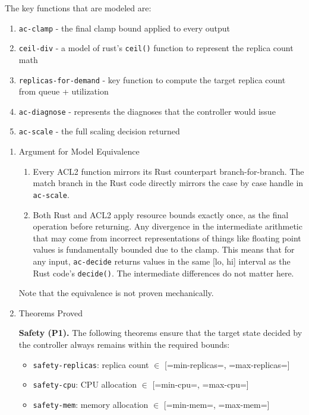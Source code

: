 \documentclass[twocolumn]{article}
\begin{document}
The key functions that are modeled are:
\begin{enumerate}
\item \texttt{ac-clamp} - the final clamp bound applied to every output
\item \texttt{ceil-div} - a model of rust's \texttt{ceil()} function to represent the replica count math
\item \texttt{replicas-for-demand} - key function to compute the target replica count from queue + utilization
\item \texttt{ac-diagnose} - represents the diagnoses that the controller would issue
\item \texttt{ac-scale} - the full scaling decision returned
\end{enumerate}
\begin{enumerate}
\item Argument for Model Equivalence
\label{sec:org02d3ddc}

\begin{enumerate}
\item Every ACL2 function mirrors its Rust counterpart branch-for-branch. The match branch in the Rust code directly mirrors the case by case handle in \texttt{ac-scale}.
\item Both Rust and ACL2 apply resource bounds exactly once, as the final operation before returning. Any divergence in the intermediate arithmetic that may come from incorrect representations of things like floating point values is fundamentally bounded due to the clamp. This means that for any input, \texttt{ac-decide} returns values in the same [lo, hi] interval as the Rust code's \texttt{decide()}. The intermediate differences do not matter here.
\end{enumerate}

Note that the equivalence is not proven mechanically.
\item Theorems Proved
\label{sec:org75688fe}

\textbf{Safety (P1).} The following theorems ensure that the target state decided by the controller always remains within the required bounds:

\begin{itemize}
\item \texttt{safety-replicas}: replica count \(\in\) {[}=min-replicas=, =max-replicas=]
\item \texttt{safety-cpu}: CPU allocation \(\in\) {[}=min-cpu=, =max-cpu=]
\item \texttt{safety-mem}: memory allocation \(\in\) {[}=min-mem=, =max-mem=]
\end{itemize}


\end{enumerate}
\end{document}
